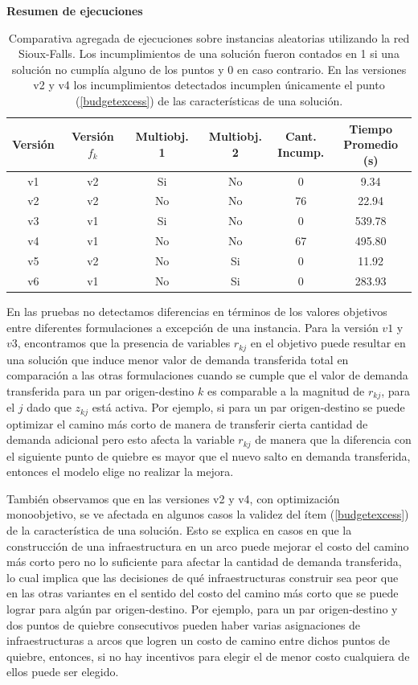 \documentclass{article}
\begin{document}
  \begin{table}[h!]
    \centering
    \caption*{{\bf Resumen de ejecuciones}}
    \begin{tabular}{cccccc}
      \toprule
      Versión & Versión $f_k$ & Multiobj. 1 & Multiobj. 2 & \shortstack{Cant. \\ Incump.} & \shortstack{Tiempo \\ Promedio (s)} \\
      \midrule
      v1 & v2 & Si & No & 0   & 9.34    \\
      v2 & v2 & No & No & 76  & 22.94   \\
      v3 & v1 & Si & No & 0   & 539.78  \\
      v4 & v1 & No & No & 67  & 495.80  \\
      v5 & v2 & No & Si & 0   & 11.92   \\
      v6 & v1 & No & Si & 0   & 283.93  \\
      \bottomrule
    \end{tabular}
    \caption{Comparativa agregada de ejecuciones sobre instancias aleatorias utilizando la red Sioux-Falls. Los incumplimientos de una solución fueron contados en 1 si una solución no cumplía alguno de los puntos y 0 en caso contrario. En las versiones v2 y v4 los incumplimientos detectados incumplen únicamente el punto (\ref{budgetexcess}) de las características de una solución.}\label{table:resumenejecuciones}
  \end{table}

  En las pruebas no detectamos diferencias en términos de los valores objetivos entre diferentes formulaciones a excepción de una instancia. Para la versión $v1$ y $v3$, encontramos que la presencia de variables $r_{kj}$ en el objetivo puede resultar en una solución que induce menor valor de demanda transferida total en comparación a las otras formulaciones cuando se cumple que el valor de demanda transferida para un par origen-destino $k$ es comparable a la magnitud de $r_{kj}$, para el $j$ dado que $z_{kj}$ está activa. Por ejemplo, si para un par origen-destino se puede optimizar el camino más corto de manera de transferir cierta cantidad de demanda adicional pero esto afecta la variable $r_{kj}$ de manera que la diferencia con el siguiente punto de quiebre es mayor que el nuevo salto en demanda transferida, entonces el modelo elige no realizar la mejora.

  También observamos que en las versiones v2 y v4, con optimización monoobjetivo, se ve afectada en algunos casos la validez del ítem (\ref{budgetexcess}) de la característica de una solución. Esto se explica en casos en que la construcción de una infraestructura en un arco puede mejorar el costo del camino más corto pero no lo suficiente para afectar la cantidad de demanda transferida, lo cual implica que las decisiones de qué infraestructuras construir sea peor que en las otras variantes en el sentido del costo del camino más corto que se puede lograr para algún par origen-destino. Por ejemplo, para un par origen-destino y dos puntos de quiebre consecutivos pueden haber varias asignaciones de infraestructuras a arcos que logren un costo de camino entre dichos puntos de quiebre, entonces, si no hay incentivos para elegir el de menor costo cualquiera de ellos puede ser elegido.
\end{document}
